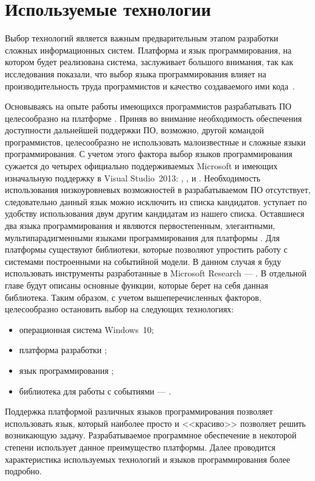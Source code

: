 \chapter{Используемые технологии}
\label{sec:practice:technology_used}

Выбор технологий является важным предварительным этапом разработки сложных информационных систем.
Платформа и язык программирования, на котором будет реализована система, заслуживает большого внимания, так как исследования показали, что выбор языка программирования влияет на производительность труда программистов и качество создаваемого ими кода~\cite[c.~59]{mcconnell_2005}.

Основываясь на опыте работы имеющихся программистов разрабатывать ПО целесообразно на платформе \dotnet{}.
Приняв во внимание необходимость обеспечения доступности дальнейшей поддержки ПО, возможно, другой командой программистов, целесообразно не использовать малоизвестные и сложные языки программирования.
С учетом этого фактора выбор языков программирования сужается до четырех официально поддерживаемых Microsoft и имеющих изначальную поддержку в Visual Studio~2013: \cppcli{}, \csharp{}, \vbnet{} и \fsharp{}.
Необходимость использования низкоуровневых возможностей \cppcli{} в разрабатываемом ПО отсутствует, следовательно данный язык можно исключить из списка кандидатов.
\vbnet{} уступает по удобству использования двум другим кандидатам из нашего списка.
Оставшиеся два языка программирования \csharp{} и \fsharp{} являются первостепенным, элегантными, мультипарадигменными языками программирования для платформы \dotnet.
Для платформы \dotnet{} существуют библиотеки, которые позволяют упростить работу с системами построенными на событийной модели.
В данном случая я буду использовать инструменты разработанные в Microsoft Research --- \rx{}. В отдельной главе будут описаны основные функции, которые берет на себя данная библиотека.
Таким образом, с учетом вышеперечисленных факторов, целесообразно остановить выбор на следующих технологиях:
\begin{itemize}
  \item операционная система Windows~10;
  \item платформа разработки \dotnet{};
  \item язык программирования \csharp{};
  \item библиотека для работы с событиями --- \rx{}.
\end{itemize}
Поддержка платформой \dotnet{} различных языков программирования позволяет использовать язык, который наиболее просто и <<красиво>> позволяет решить возникающую задачу.
Разрабатываемое программное обеспечение в некоторой степени использует данное преимущество платформы.
Далее проводится характеристика используемых технологий и языков программирования более подробно.

